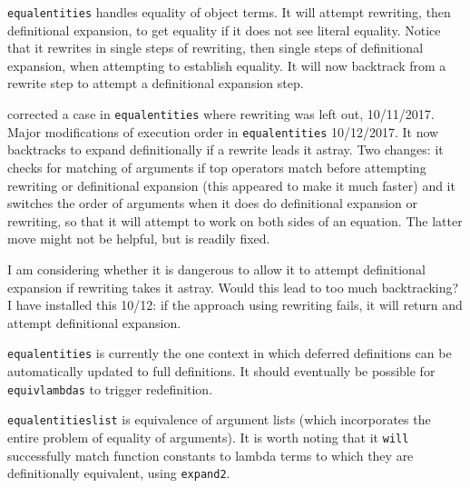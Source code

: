 \documentclass{article}
\begin{document}
{\tt equalentities} handles equality of object terms. It will attempt rewriting, then definitional expansion, to get equality if it does not
see literal equality.  Notice that it rewrites in single steps of rewriting, then single steps of definitional expansion, when attempting to establish equality.
It will now backtrack from a rewrite step to attempt a definitional expansion step.

corrected a case in {\tt equalentities} where rewriting was left out, 10/11/2017.  Major modifications of execution order in {\tt equalentities} 10/12/2017.
It now backtracks to expand definitionally if a rewrite leads it astray.  Two changes:  it checks for matching of arguments if top operators match before attempting rewriting or definitional expansion (this appeared to make it much faster) and it switches the order of arguments when it
does do definitional expansion or rewriting, so that it will attempt to work on both sides of an equation.  The latter move might not be helpful, 
but is readily fixed.

I am considering whether it is dangerous to allow it to attempt definitional expansion if rewriting takes it astray.  Would this lead to too much backtracking?
I have installed this 10/12:  if the approach using rewriting fails, it will return and attempt definitional expansion.

{\tt equalentities} is currently the one context in which deferred definitions can be automatically updated to full definitions.   It should eventually be possible
for {\tt equivlambdas} to trigger redefinition.

{\tt equalentitieslist} is equivalence of argument lists (which incorporates the entire problem of equality of arguments).  It is worth noting that
it {\tt will} successfully match function constants to lambda terms to which they are definitionally equivalent, using {\tt expand2}.
\end{document}
